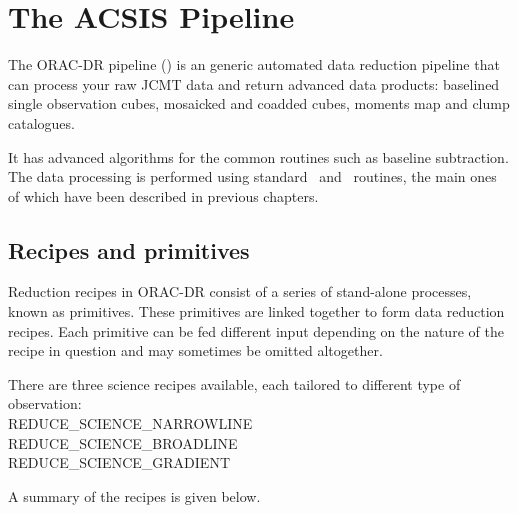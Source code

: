 \documentclass[11pt,oneside,chapters]{starlink}
\begin{document}
\newpage
\chapter{The ACSIS Pipeline}
\label{sec:pipe}

The ORAC-DR pipeline (\cite{oracdr}) is an generic automated data
reduction pipeline that can process your raw JCMT data and return
advanced data products: baselined single observation cubes, mosaicked
and coadded cubes, moments map and clump catalogues.

It has advanced algorithms for the common routines such as baseline
subtraction. The data processing is performed using standard \Kappa\
and \smurf\ routines, the main ones of which have been described in
previous chapters.

\section{Recipes and primitives}
\label{sec:recipes}

Reduction recipes in ORAC-DR consist of a series of stand-alone
processes, known as primitives. These primitives are linked together
to form data reduction recipes. Each primitive can be fed different
input depending on the nature of the recipe in question and may
sometimes be omitted altogether.

There are three science recipes available, each tailored to different
type of observation:\\
REDUCE\_SCIENCE\_NARROWLINE\\
REDUCE\_SCIENCE\_BROADLINE\\
REDUCE\_SCIENCE\_GRADIENT

A summary of the recipes is given below.
\end{document}
